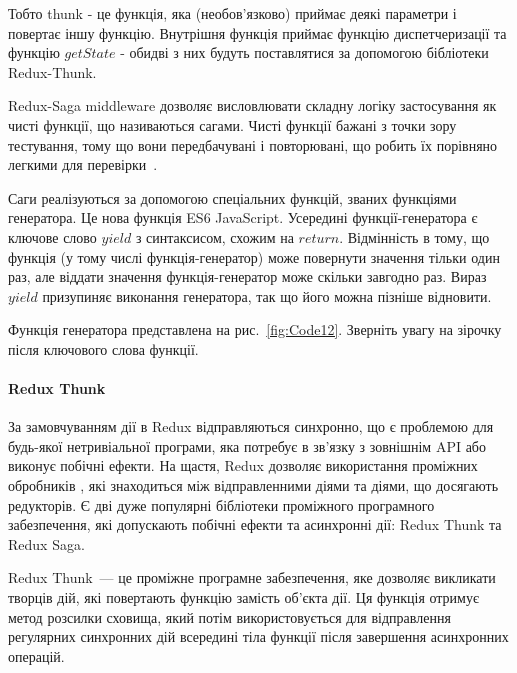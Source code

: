 Тобто thunk - це функція, яка (необов'язково) приймає деякі параметри і повертає іншу функцію. Внутрішня функція приймає функцію диспетчеризації та функцію $getState$ - обидві з них будуть поставлятися за допомогою бібліотеки Redux-Thunk.

Redux-Saga middleware дозволяє висловлювати складну логіку застосування як чисті функції, що називаються сагами. Чисті функції бажані з точки зору тестування, тому що вони передбачувані і повторювані, що робить їх порівняно легкими для перевірки~\cite{hung2018architectural}.

Саги реалізуються за допомогою спеціальних функцій, званих функціями генератора. Це нова функція ES6 JavaScript. Усередині функції-генератора є ключове слово $yield$ з синтаксисом, схожим на $return$. Відмінність в тому, що функція (у тому числі функція-генератор) може повернути значення тільки один раз, але віддати значення функція-генератор може скільки завгодно раз. Вираз $yield$ призупиняє виконання генератора, так що його можна пізніше відновити.

Функція генератора представлена на рис.~\ref{fig:Code12}. Зверніть увагу на зірочку після ключового слова функції.


\paragraph{Redux Thunk}


За замовчуванням дії в Redux відправляються синхронно, що є проблемою для будь-якої нетривіальної програми, яка потребує в зв'язку з зовнішнім API або виконує побічні ефекти. На щастя, Redux дозволяє використання проміжних обробників , які знаходиться між відправленними діями та діями, що досягають редукторів. Є дві дуже популярні бібліотеки проміжного програмного забезпечення, які допускають побічні ефекти та асинхронні дії: Redux Thunk та Redux Saga.

Redux Thunk~--- це проміжне програмне забезпечення, яке дозволяє викликати творців дій, які повертають функцію замість об'єкта дії. Ця функція отримує метод розсилки сховища, який потім використовується для відправлення регулярних синхронних дій всередині тіла функції після завершення асинхронних операцій.

